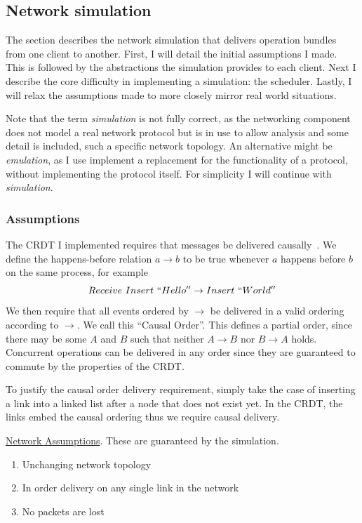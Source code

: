\documentclass[12pt,a4paper,twoside,openright]{report}
\begin{document}
	\subsection{Network simulation}

	
		The section describes the network simulation that delivers operation bundles from one client to another. First, I will detail the initial assumptions I made. This is followed by the abstractions the simulation provides to each client. Next I describe the core difficulty in implementing a simulation: the scheduler. Lastly, I will relax the assumptions made to more closely mirror real world situations.
		
		Note that the term \textit{simulation} is not fully correct, as the networking component does not model a real network protocol but is in use to allow analysis and some detail is included, such a specific network topology. An alternative might be \textit{emulation}, as I use implement a replacement for the functionality of a protocol, without implementing the protocol itself. For simplicity I will continue with \textit{simulation}.
		
		\subsubsection{Assumptions} 
		The CRDT I implemented requires that messages be delivered causally~\cite{concdistsystems}. We define the happens-before relation \(a \rightarrow b\) to be true whenever $a$ happens before $b$ on the same process, for example \[Receive\ Insert\ ``Hello'' \rightarrow Insert\ `` World''\]
		We then require that all events ordered by $\rightarrow$ be delivered in a valid ordering according to $\rightarrow$. We call this ``Causal Order''. This defines a partial order, since there may be some $A$ and $B$ such that neither $A \rightarrow B$ nor $B \rightarrow A$ holds. Concurrent operations can be delivered in any order since they are guaranteed to commute by the properties of the CRDT.
		
		To justify the causal order delivery requirement, simply take the case of inserting a link into a linked list after a node that does not exist yet. In the CRDT, the links embed the causal ordering thus we require causal delivery.
		
		\underline{Network Assumptions}. These are guaranteed by the simulation.
		\begin{enumerate}
			\item Unchanging network topology
			\item In order delivery on any single link in the network
			\item No packets are lost
		\end{enumerate}
		
\end{document}
